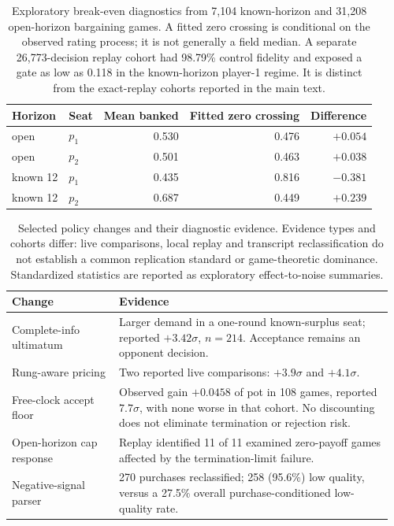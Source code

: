 \begin{table}[H]
\centering\small
\caption{Exploratory break-even diagnostics from 7,104 known-horizon and
31,208 open-horizon bargaining games. A fitted zero crossing is conditional on
the observed rating process; it is not generally a field median. A separate
26,773-decision replay cohort had 98.79\% control fidelity and exposed a gate
as low as 0.118 in the known-horizon player-1 regime. It is distinct from the
exact-replay cohorts reported in the main text.}
\label{tab:breakeven}
\begin{tabular}{@{}llrrr@{}}
\toprule
Horizon & Seat & Mean banked & Fitted zero crossing & Difference\\
\midrule
open & $p_1$ & 0.530 & 0.476 & $+0.054$\\
open & $p_2$ & 0.501 & 0.463 & $+0.038$\\
known 12 & $p_1$ & 0.435 & 0.816 & $-0.381$\\
known 12 & $p_2$ & 0.687 & 0.449 & $+0.239$\\
\bottomrule
\end{tabular}
\end{table}

\begin{table}[H]
\centering\small
\caption{Selected policy changes and their diagnostic evidence. Evidence
types and cohorts differ: live comparisons, local replay and transcript
reclassification do not establish a common replication standard or
game-theoretic dominance. Standardized statistics are reported as exploratory
effect-to-noise summaries.}
\label{tab:ledger}
\begin{tabular}{@{}p{0.27\linewidth}p{0.69\linewidth}@{}}
\toprule
Change & Evidence\\
\midrule
Complete-info ultimatum & Larger demand in a one-round known-surplus seat;
reported $+3.42\sigma$, $n=214$. Acceptance remains an opponent decision.\\
Rung-aware pricing & Two reported live comparisons: $+3.9\sigma$ and
$+4.1\sigma$.\\
Free-clock accept floor & Observed gain $+0.0458$ of pot in 108 games,
reported $7.7\sigma$, with none worse in that cohort. No discounting does not
eliminate termination or rejection risk.\\
Open-horizon cap response & Replay identified 11 of 11 examined zero-payoff
games affected by the termination-limit failure.\\
Negative-signal parser & 270 purchases reclassified; 258 (95.6\%) low quality,
versus a 27.5\% overall purchase-conditioned low-quality rate.\\
\bottomrule
\end{tabular}
\end{table}

